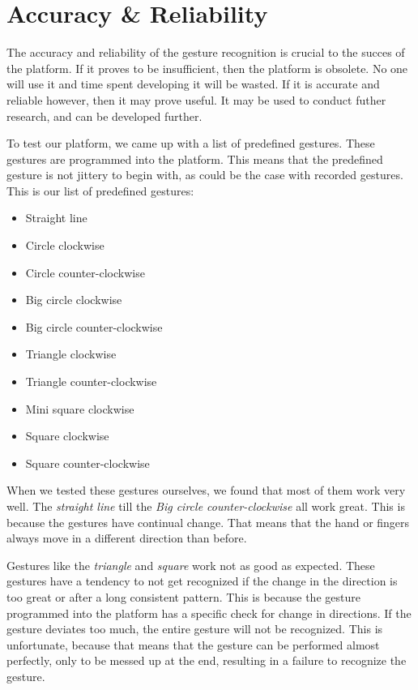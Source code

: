 \documentclass[a4paper]{article}
\providecommand{\tightlist}{%
\setlength{\itemsep}{0pt}\setlength{\parskip}{0pt}}
\begin{document}
  \section*{Accuracy \& Reliability}
  The accuracy and reliability of the gesture recognition is crucial to the
  succes of the platform. If it proves to be insufficient, then the platform is
  obsolete. No one will use it and time spent developing it will be wasted. If
  it is accurate and reliable however, then it may prove useful. It may be used
  to conduct futher research, and can be developed further.

  To test our platform, we came up with a list of predefined gestures. These
  gestures are programmed into the platform. This means that the predefined
  gesture is not jittery to begin with, as could be the case with recorded
  gestures. This is our list of predefined gestures:
  \begin{itemize}
    \tightlist
    \item Straight line
    \item Circle clockwise
    \item Circle counter-clockwise
    \item Big circle clockwise
    \item Big circle counter-clockwise
    \item Triangle clockwise
    \item Triangle counter-clockwise
    \item Mini square clockwise
    \item Square clockwise
    \item Square counter-clockwise
  \end{itemize}

  When we tested these gestures ourselves, we found that most of them work very
  well. The \textit{straight line} till the \textit{Big circle counter-clockwise}
  all work great. This is because the gestures have continual change. That means
  that the hand or fingers always move in a different direction than before.

  Gestures like the \textit{triangle} and \textit{square} work not as good as
  expected. These gestures have a tendency to not get recognized if the change
  in the direction is too great or after a long consistent pattern. This is
  because the gesture programmed into the platform has a specific check for
  change in directions. If the gesture deviates too much, the entire gesture
  will not be recognized. This is unfortunate, because that means that the
  gesture can be performed almost perfectly, only to be messed up at the end,
  resulting in a failure to recognize the gesture.
\end{document}
